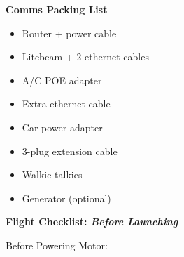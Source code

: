 \documentclass[]{auvsi_doc}
\begin{document}
\hrulefill

\textbf{Comms Packing List}
\begin{itemize}
	\item Router + power cable
	\item Litebeam + 2 ethernet cables
	\item A/C POE adapter
	\item Extra ethernet cable
	\item Car power adapter
	\item 3-plug extension cable
	\item Walkie-talkies
	\item Generator (optional)
\end{itemize}

\hrulefill

\textbf{Flight Checklist: \textit{Before Launching}}

Before Powering Motor:
\end{document}
